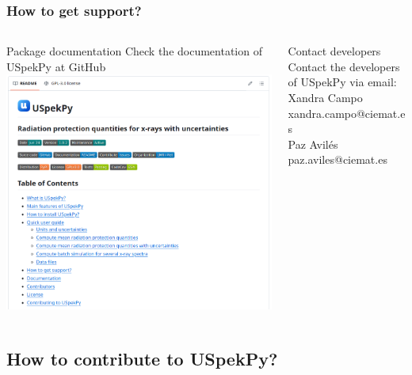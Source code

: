 \documentclass{beamer}
\newcommand{\highlight}[1]{{\color{blue} #1}}
\begin{document}
	\begin{frame}
		\frametitle{How to get support?}
		\begin{columns}[t]
			\begin{column}{0.45\textwidth}
				\begin{block}{\centering Package documentation}
					\centering
					Check the \highlight{documentation} of USpekPy at GitHub
					\href{https://github.com/lmri-met/uspekpy\#readme}{}\\
					\medskip
					\includegraphics[width=\textwidth]{readme}
				\end{block}
			\end{column}
			\begin{column}{0.45\textwidth}
				\begin{block}{\centering Contact developers}
					\centering
					\bigskip
					Contact the developers of USpekPy \highlight{via email}:\\
					\bigskip
					Xandra Campo\\xandra.campo@ciemat.es\\
					\bigskip
					Paz Avilés\\paz.aviles@ciemat.es
				\end{block}	
			\end{column}
		\end{columns}
	\end{frame}
	
	\subsection{How to contribute to USpekPy?}
	
\end{document}
